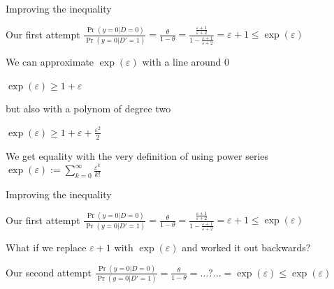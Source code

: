 \documentclass[12pt,aspectratio=169,handout]{beamer}
\begin{document}
\begin{frame}{Improving the inequality}

\begin{block}{Our first attempt}
$\frac{\Pr(y = 0 | D = 0)}{\Pr(y = 0 | D' = 1)} =
\frac{\theta}{1 - \theta} =
\frac{
\frac{\varepsilon + 1}{\varepsilon + 2}
}{
	1 - \frac{\varepsilon + 1}{\varepsilon + 2}
}
=
\varepsilon + 1
\leq \exp(\varepsilon)$
\end{block}

We can approximate $\exp(\varepsilon)$ with a line around 0

$\exp(\varepsilon) \geq 1 + \varepsilon$

but also with a polynom of degree two

$\exp(\varepsilon) \geq 1 + \varepsilon + \frac{\varepsilon^2}{2}$

We get equality with the very definition of using power series
$\exp(\varepsilon) := \sum_{k = 0}^{\infty} \frac{\varepsilon^k}{k!}$
\end{frame}


\begin{frame}{Improving the inequality}

\begin{block}{Our first attempt}
$\frac{\Pr(y = 0 | D = 0)}{\Pr(y = 0 | D' = 1)} =
\frac{\theta}{1 - \theta} =
\frac{
\frac{\varepsilon + 1}{\varepsilon + 2}
}{
	1 - \frac{\varepsilon + 1}{\varepsilon + 2}
}
=
\varepsilon + 1
\leq \exp(\varepsilon)$
\end{block}

What if we replace $\varepsilon + 1$ with $\exp(\varepsilon)$ and worked it out backwards?


\begin{block}{Our second attempt}
$\frac{\Pr(y = 0 | D = 0)}{\Pr(y = 0 | D' = 1)} =
\frac{\theta}{1 - \theta} =
\ldots ? \ldots
=
\exp(\varepsilon)
\leq \exp(\varepsilon)$
\end{block}


\end{frame}
\end{document}
